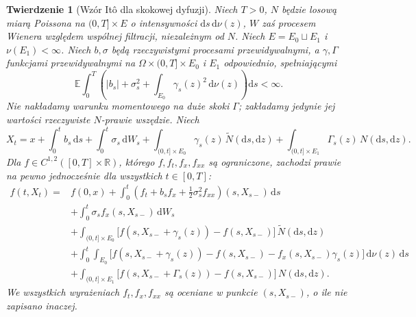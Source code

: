 \documentclass[11pt,a4paper,oneside]{report}
\numberwithin{equation}{chapter}
\theoremstyle{plain}
\newtheorem{twierdzenie}{Twierdzenie}[chapter]
\theoremstyle{definition}
\theoremstyle{remark}
\newcommand{\R}{\mathbb{R}}
\newcommand{\E}{\mathbb{E}}
\newcommand{\dd}{\mathrm{d}}
\begin{document}
\begin{twierdzenie}[Wzór Itô dla skokowej dyfuzji]\label{thm:volIII:12:02}
\label{th:ito-jump-diffusion}
Niech $T>0$, $N$ będzie losową miarą Poissona na
$(0,T]\times E$ o intensywności $\dd s\,\dd\nu(z)$,
$W$ zaś procesem Wienera względem wspólnej filtracji,
niezależnym od $N$. Niech $E=E_0\sqcup E_1$ i
$\nu(E_1)<\infty$. Niech $b,\sigma$ będą rzeczywistymi
procesami przewidywalnymi, a $\gamma,\Gamma$ funkcjami
przewidywalnymi na $\Omega\times(0,T]\times E_0$ i $E_1$
odpowiednio, spełniającymi
\[
\E\int_0^T\left(|b_s|+\sigma_s^2+
\int_{E_0}\gamma_s(z)^2\,\dd\nu(z)\right)\dd s<\infty.
\]
Nie nakładamy warunku momentowego na duże skoki $\Gamma$;
zakładamy jedynie jej wartości rzeczywiste $N$-prawie wszędzie.
Niech
\[
X_t=x+\int_0^tb_s\,\dd s+\int_0^t\sigma_s\,\dd W_s
+\int_{(0,t]\times E_0}\gamma_s(z)\,\widetilde N(\dd s,\dd z)
+\int_{(0,t]\times E_1}\Gamma_s(z)\,N(\dd s,\dd z).
\]
Dla $f\in C^{1,2}([0,T]\times\R)$, którego
$f,f_t,f_x,f_{xx}$ są ograniczone, zachodzi prawie na pewno
jednocześnie dla wszystkich $t\in[0,T]$:
\[
\begin{split}
f(t,X_t)={}&f(0,x)
+\int_0^t\left(f_t+b_sf_x+\tfrac12\sigma_s^2f_{xx}\right)(s,X_{s-})\,\dd s\\
&+\int_0^t\sigma_s f_x(s,X_{s-})\,\dd W_s\\
&+\int_{(0,t]\times E_0}
\bigl[f(s,X_{s-}+\gamma_s(z))-f(s,X_{s-})\bigr]
\,\widetilde N(\dd s,\dd z)\\
&+\int_0^t\int_{E_0}
\bigl[f(s,X_{s-}+\gamma_s(z))-f(s,X_{s-})
-f_x(s,X_{s-})\gamma_s(z)\bigr] \,\dd\nu(z)\,\dd s\\
&+\int_{(0,t]\times E_1}
\bigl[f(s,X_{s-}+\Gamma_s(z))-f(s,X_{s-})\bigr]
\,N(\dd s,\dd z).
\end{split}
\tag{12.4}\label{eq:ito-jump-general}
\]
We wszystkich wyrażeniach $f_t,f_x,f_{xx}$ są oceniane
w punkcie $(s,X_{s-})$, o ile nie zapisano inaczej.
\end{twierdzenie}
\end{document}
